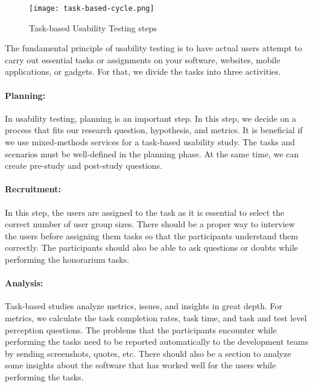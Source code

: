 \begin{figure}[htbp!]
  \centering    
  \texttt{[image: task-based-cycle.png]}
  \caption[Tasks steps]{Task-based Usability Testing steps}
  \label{fig:background:taskssteps}
\end{figure}
The fundamental principle of usability testing is to have actual users attempt to carry out essential tasks or assignments on your software, websites, mobile applications, or gadgets.
For that, we divide the tasks into three activities.
\paragraph{Planning: } 
In usability testing, planning is an important step. 
In this step, we decide on a process that fits our research question, hypothesis, and metrics.  
It is beneficial if we use mixed-methods services for a task-based usability study.
The tasks and scenarios must be well-defined in the planning phase. At the same time, we can create pre-study and post-study questions. 
\paragraph{Recruitment: } 
In this step, the users are assigned to the task as it is essential to select the correct number of user group sizes.
There should be a proper way to interview the users before assigning them tasks so that the participants understand them correctly. 
The participants should also be able to ask questions or doubts while performing the honorarium tasks. 
\paragraph{Analysis: }
Task-based studies analyze metrics, issues, and insights in great depth.
For metrics, we calculate the task completion rates, task time, and task and test level perception questions.
The problems that the participants encounter while performing the tasks need to be reported automatically to the development teams by sending screenshots, quotes, etc. 
There should also be a section to analyze some insights about the software that has worked well for the users while performing the tasks.
\clearpage

